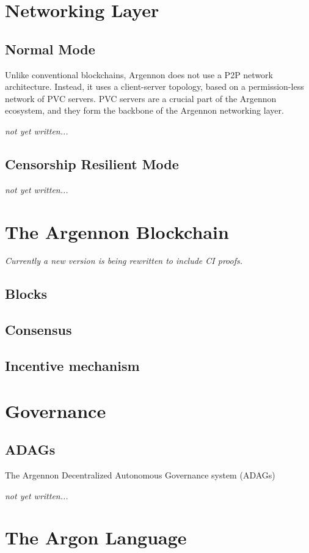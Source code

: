 \documentclass[11pt, a4paper]{report}
\newcommand{\note}[1] {
    \begin{tcolorbox}[colframe=white,colback=white]
        \emph{#1}
    \end{tcolorbox}
}
\begin{document}
    \chapter{Networking Layer}\label{ch:networking}


    \section{Normal Mode}\label{sec:normal-mode}
    Unlike conventional blockchains, Argennon does not use a P2P network architecture. Instead, it uses a
    client-server topology, based on a permission-less network of PVC servers. PVC servers are a
    crucial part of the Argennon ecosystem, and they form the backbone of the Argennon networking layer.
    \note{not yet written...}


    \section{Censorship Resilient Mode}\label{sec:cens-res-mode}
    \note{not yet written...}


    \chapter{The Argennon Blockchain}\label{ch:argennon-blockchain}
    \note{Currently a new version is being rewritten to include CI proofs.}

    \section{Blocks}\label{sec:blocks}
    


    \section{Consensus}\label{sec:consensus}
    

    


    \section{Incentive mechanism}\label{sec:incentive-mechanism}
    


    \chapter{Governance}\label{ch:governance}


    \section{ADAGs}\label{sec:adags}
    The Argennon Decentralized Autonomous Governance system (ADAGs)
    \note{not yet written...}


    \chapter{The Argon Language}\label{ch:argon-lang}
    
\end{document}
